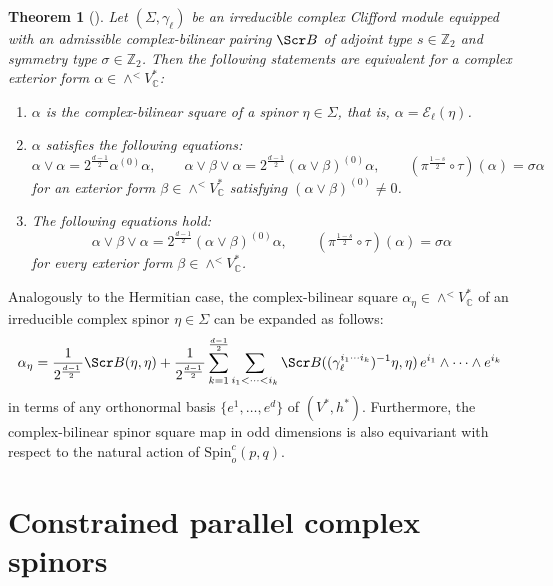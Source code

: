 \documentclass[10pt,a4paper,twoside,reqno]{amsart}
\theoremstyle{plain}
\newtheorem{thm}{Theorem}[section]
\theoremstyle{definition}
\theoremstyle{remark}
\def\C{\mathbb{C}}
\def\scB{\Scr B}
\def\Spin{\mathrm{Spin}}
\def\Spin{\mathrm{Spin}}
\def\cE{\mathcal{E}}
\begin{document}
\begin{thm}[{\cite[Thm.\ 4.12]{Algebraic_Complex_Square_2025}}]\label{thm:odd_complex-bilinear_square}
    Let $(\Sigma,\gamma_\ell)$ be an irreducible complex Clifford module equipped with an admissible complex-bilinear pairing $\scB$ of adjoint type $s\in\mathbb{Z}_2$ and symmetry type $\sigma\in\mathbb{Z}_2$. Then the following statements are equivalent for a complex exterior form $\alpha\in\wedge^<V^*_\C$: \begin{enumerate}
        \item[\normalfont(a)] $\alpha$ is the complex-bilinear square of a spinor $\eta\in\Sigma$, that is, $\alpha=\cE_\ell(\eta)$.
        \item[\normalfont(b)] $\alpha$ satisfies the following equations: $$\alpha\vee\alpha=2^{\frac{d-1}{2}}\alpha^{(0)}\alpha,\qquad\alpha\vee\beta\vee\alpha=2^{\frac{d-1}{2}}(\alpha\vee\beta)^{(0)}\alpha,\qquad(\pi^{\frac{1-s}{2}}\circ\tau)(\alpha)=\sigma\alpha$$ for an exterior form $\beta\in\wedge^<V^*_\C$ satisfying $(\alpha\vee\beta)^{(0)}\neq0$.
        \item[\normalfont(c)] The following equations hold: $$\alpha\vee\beta\vee\alpha=2^{\frac{d-1}{2}}(\alpha\vee\beta)^{(0)}\alpha,\qquad(\pi^{\frac{1-s}{2}}\circ\tau)(\alpha)=\sigma\alpha$$ for every exterior form $\beta\in\wedge^<V^*_\C$.
    \end{enumerate}
\end{thm}

Analogously to the Hermitian case, the complex-bilinear square $\alpha_\eta\in\wedge^<V^*_\C$ of an irreducible complex spinor $\eta\in\Sigma$ can be expanded as follows: \begin{equation*}\label{eq:odd_explicit_complexbilinearsquare}
    \alpha_{\eta} = \frac{1}{2^{\frac{d-1}{2}}} \scB(\eta,\eta) + \frac{1}{2^{\frac{d-1}{2}}} \sum_{k=1}^{\frac{d-1}{2}} \sum_{i_1 < \cdots < i_k} \scB((\gamma_\ell^{i_1 \cdots i_k})^{-1}\eta , \eta)\, e^{i_1}\wedge  \cdots \wedge e^{i_k}
\end{equation*} in terms of any orthonormal basis $\{e^1,\ldots,e^d\}$ of $(V^*,h^*)$. Furthermore, the complex-bilinear spinor square map in odd dimensions is also equivariant with respect to the natural action of $\Spin^c_o(p,q)$.


\section{Constrained parallel complex spinors}
\label{sec:constrained_parallel_spinors}
\end{document}
